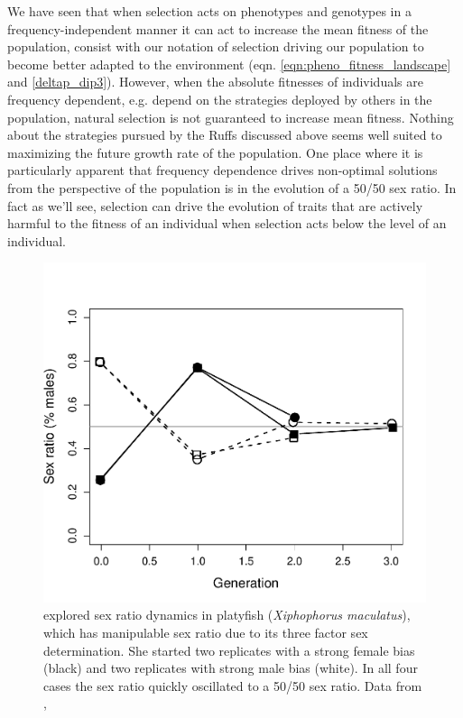 {We have seen that when selection acts on phenotypes and genotypes in a
frequency-independent manner it can act to
increase the mean fitness of the population, consist with our
notation of selection driving our population to become better adapted
to the environment (eqn. \eqref{eqn:pheno_fitness_landscape} and \eqref{deltap_dip3}). However, when the
absolute fitnesses of individuals are frequency dependent, e.g. depend
on the strategies deployed by others in the population, natural
selection is not guaranteed to increase mean fitness. Nothing about
the strategies pursued by the Ruffs discussed above seems well suited to
maximizing the future growth rate of the population. 
One place where it is particularly apparent that frequency dependence
drives non-optimal solutions from the perspective of the population is in the evolution of a 50/50 sex
ratio. In fact as we'll see, selection can drive the evolution of
traits that are actively harmful to the fitness of an individual when
selection acts below the level of an individual. 




\begin{figure}
\begin{center}
\includegraphics[width= 0.75 \textwidth]{Journal_figs/single_locus_selection/Sex_ratio_basolo/Sex_ratio_basolo.pdf}
\end{center}
\caption{\citet{basolo1994dynamics} explored sex ratio dynamics in platyfish ({\it Xiphophorus
 maculatus}), which has manipulable sex ratio due to its three factor sex determination. She started two replicates with a strong female bias (black) and two replicates with strong male bias (white). In all four cases the sex ratio quickly oscillated to a 50/50 sex ratio.  Data from \citet{basolo1994dynamics}, } \label{fig:sex_ratio}
\end{figure}

}
